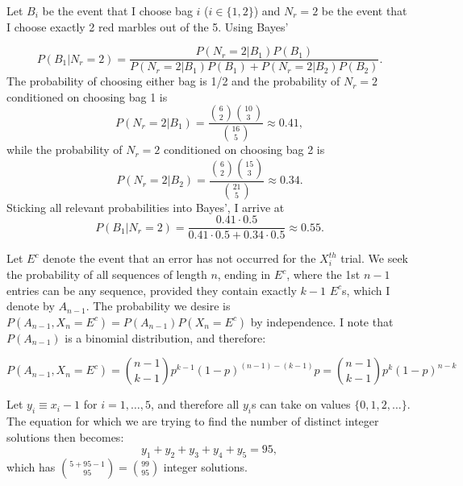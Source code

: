 \begin{problem}{17} Let $B_i$ be the event that I choose bag $i$ ($i \in \{1, 2\}$) and $N_r = 2$ be the event that I choose exactly 2 red marbles out of the 5.  Using Bayes'

\begin{equation}
P(B_1|N_r=2) = \frac{P(N_r=2|B_1)P(B_1)}{P(N_r=2|B_1)P(B_1)+P(N_r=2|B_2)P(B_2)}.
\end{equation}
The probability of choosing either bag is 1/2 and the probability of $N_r = 2$ conditioned on choosing bag 1 is
\begin{equation*}
P(N_r=2|B_1) = \frac{\binom{6}{2} \binom{10}{3}}{\binom{16}{5}} \approx 0.41,
\end{equation*}
while the probability of $N_r = 2$ conditioned on choosing bag 2 is
\begin{equation*}
P(N_r=2|B_2) = \frac{\binom{6}{2} \binom{15}{3}}{\binom{21}{5}} \approx 0.34.
\end{equation*}
Sticking all relevant probabilities into Bayes', I arrive at
\begin{equation}
P(B_1|N_r=2) = \frac{0.41 \cdot  0.5}{0.41 \cdot  0.5+0.34 \cdot  0.5} \approx 0.55.
\end{equation}

\end{problem}


\begin{problem}{18}
Let $E^c$ denote the event that an error has not occurred for the $X_i^{th}$ trial.  We seek the probability of all sequences of length $n$, ending in $E^c$, where the 1st $n-1$ entries can be any sequence, provided they contain exactly $k-1$ $E^c$s, which I denote by $A_{n-1}$.  The probability we desire is $P(A_{n-1}, X_{n}=E^c) = P(A_{n-1})P(X_{n}=E^c)$ by independence.  I note that $P(A_{n-1})$ is a binomial distribution, and therefore:

\begin{equation*}
P(A_{n-1}, X_{n}=E^c) = \binom{n-1}{k-1}p^{k-1}(1-p)^{(n-1)-(k-1)}p = \binom{n-1}{k-1}p^{k}(1-p)^{n-k}
\end{equation*}
\end{problem}




\begin{problem}{19} Let $y_i \equiv x_i -1$ for $i=1, \ldots, 5$, and therefore all $y_i$s can take on values $\{0, 1, 2, \ldots \}$.  The equation for which we are trying to find the number of distinct integer solutions then becomes:
\begin{equation}
y_1+y_2+y_3+y_4+y_5 = 95,
\end{equation}
which has $\binom{5+95-1}{95}=\binom{99}{95}$ integer solutions.

\end{problem}


